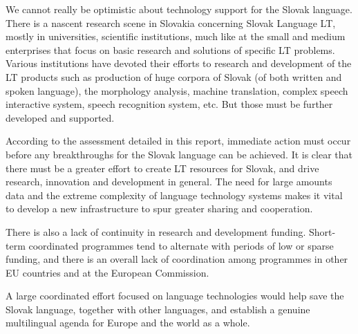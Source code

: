 \begin{multicols}{2}
We cannot really be optimistic about technology support for the Slovak
language. There is a nascent research scene in Slovakia concerning Slovak
Language LT, mostly in universities, scientific institutions, much like at the
small and medium enterprises that focus on basic research and solutions of
specific LT problems. Various institutions have devoted their efforts to
research and development of the LT products such as production of huge corpora of Slovak (of both written and spoken language), the morphology analysis, machine translation, complex speech interactive system, speech recognition system, etc. But those must be further developed and supported. 

According to the assessment detailed in this report, immediate action must
occur before any breakthroughs for the Slovak language can be achieved. It is
clear that there must be a greater effort to create LT resources for Slovak,
and drive research, innovation and development in general. The need for large
amounts data and the extreme complexity of language technology systems makes it
vital to develop a new infrastructure to spur greater sharing and cooperation.

There is also a lack of continuity in research and development funding. Short-term coordinated programmes tend to alternate with periods of low or sparse funding, and there is an overall lack of coordination among programmes in other EU countries and at the European Commission.

A large coordinated effort focused on language technologies would help
save the Slovak language, together with other languages, and establish a
genuine multilingual agenda for Europe and the world as a
whole.\cite{f32}

\end{multicols}

\clearpage



